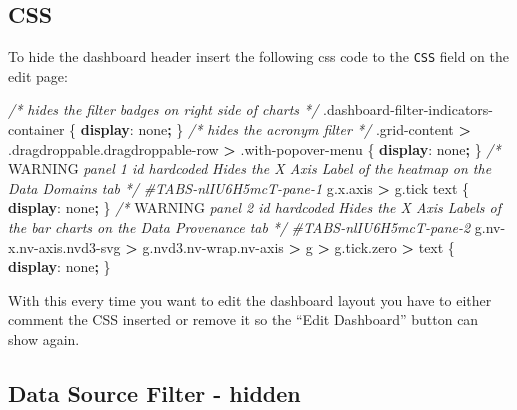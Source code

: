 \documentclass[
]{book}
\newenvironment{Shaded}{\begin{snugshade}}{\end{snugshade}}
\newcommand{\AlertTok}[1]{\textcolor[rgb]{0.94,0.16,0.16}{#1}}
\newcommand{\CommentTok}[1]{\textcolor[rgb]{0.56,0.35,0.01}{\textit{#1}}}
\newcommand{\DecValTok}[1]{\textcolor[rgb]{0.00,0.00,0.81}{#1}}
\newcommand{\FunctionTok}[1]{\textcolor[rgb]{0.00,0.00,0.00}{#1}}
\newcommand{\KeywordTok}[1]{\textcolor[rgb]{0.13,0.29,0.53}{\textbf{#1}}}
\newcommand{\NormalTok}[1]{#1}
\newcommand{\OperatorTok}[1]{\textcolor[rgb]{0.81,0.36,0.00}{\textbf{#1}}}
\newcommand{\PreprocessorTok}[1]{\textcolor[rgb]{0.56,0.35,0.01}{\textit{#1}}}
\begin{document}
\hypertarget{css-9}{%
\subsection*{CSS}\label{css-9}}

To hide the dashboard header insert the following css code to the \texttt{CSS} field on the edit page:

\begin{Shaded}
\begin{Highlighting}[]
\CommentTok{/* hides the filter badges on right side of charts */}
\FunctionTok{.dashboard{-}filter{-}indicators{-}container}\NormalTok{ \{}
    \KeywordTok{display}\NormalTok{: }\DecValTok{none}\OperatorTok{;}
\NormalTok{\}}
\CommentTok{/* hides the acronym filter */}
\FunctionTok{.grid{-}content} \OperatorTok{\textgreater{}} \FunctionTok{.dragdroppable.dragdroppable{-}row} \OperatorTok{\textgreater{}} \FunctionTok{.with{-}popover{-}menu}\NormalTok{ \{}
    \KeywordTok{display}\NormalTok{: }\DecValTok{none}\OperatorTok{;}
\NormalTok{\}}
\CommentTok{/*}
\AlertTok{WARNING}\CommentTok{ panel 1 id hardcoded}
\CommentTok{Hides the X Axis Label of the heatmap on the Data Domains tab}
\CommentTok{*/}
\PreprocessorTok{\#TABS{-}nlIU6H5mcT{-}pane{-}1}\NormalTok{ g}\FunctionTok{.x.axis} \OperatorTok{\textgreater{}}\NormalTok{ g}\FunctionTok{.tick}\NormalTok{ text \{}
    \KeywordTok{display}\NormalTok{: }\DecValTok{none}\OperatorTok{;}
\NormalTok{\}}
\CommentTok{/*}
\AlertTok{WARNING}\CommentTok{ panel 2 id hardcoded}
\CommentTok{Hides the X Axis Labels of the bar charts on the Data Provenance tab}
\CommentTok{*/}
\PreprocessorTok{\#TABS{-}nlIU6H5mcT{-}pane{-}2}\NormalTok{ g}\FunctionTok{.nv{-}x.nv{-}axis.nvd3{-}svg} \OperatorTok{\textgreater{}}\NormalTok{ g}\FunctionTok{.nvd3.nv{-}wrap.nv{-}axis} \OperatorTok{\textgreater{}}\NormalTok{ g }\OperatorTok{\textgreater{}}\NormalTok{ g}\FunctionTok{.tick.zero} \OperatorTok{\textgreater{}}\NormalTok{ text \{}
    \KeywordTok{display}\NormalTok{: }\DecValTok{none}\OperatorTok{;}
\NormalTok{\}}
\end{Highlighting}
\end{Shaded}

With this every time you want to edit the dashboard layout you have to either comment the CSS inserted
or remove it so the ``Edit Dashboard'' button can show again.

\hypertarget{data-source-filter---hidden}{%
\subsection*{Data Source Filter - hidden}\label{data-source-filter---hidden}}
\end{document}
